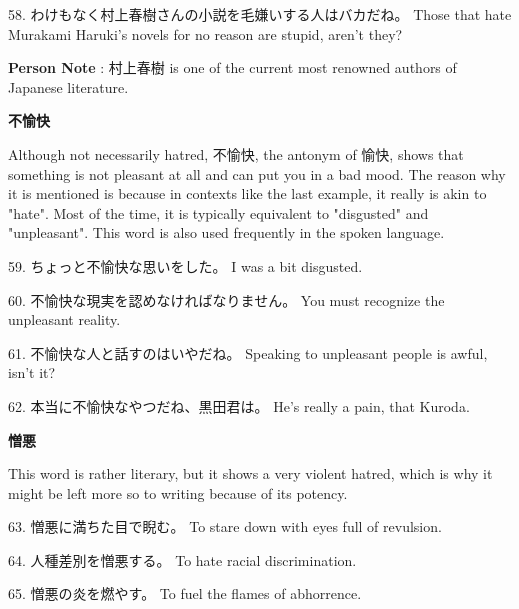 \par{58. わけもなく村上春樹さんの小説を毛嫌いする人はバカだね。 \hfill\break
Those that hate Murakami Haruki's novels for no reason are stupid, aren't they? }
 
\par{\textbf{Person Note }: 村上春樹 is one of the current most renowned authors of Japanese literature. }
 
\begin{center}
\textbf{不愉快 }
\end{center}
 
\par{ Although not necessarily hatred, 不愉快, the antonym of 愉快, shows that something is not pleasant at all and can put you in a bad mood. The reason why it is mentioned is because in contexts like the last example, it really is akin to "hate". Most of the time, it is typically equivalent to "disgusted" and "unpleasant". This word is also used frequently in the spoken language. }
 
\par{59. ちょっと不愉快な思いをした。 \hfill\break
I was a bit disgusted. }
 
\par{60. 不愉快な現実を認めなければなりません。 \hfill\break
You must recognize the unpleasant reality. }
 
\par{61. 不愉快な人と話すのはいやだね。 \hfill\break
Speaking to unpleasant people is awful, isn't it? }
 
\par{62. 本当に不愉快なやつだね、黒田君は。 \hfill\break
He's really a pain, that Kuroda. }
 
\begin{center}
\textbf{憎悪 } 
\end{center}
 
\par{ This word is rather literary, but it shows a very violent hatred, which is why it might be left more so to writing because of its potency. }
 
\par{63. 憎悪に満ちた目で睨む。 \hfill\break
To stare down with eyes full of revulsion. }
 
\par{64. 人種差別を憎悪する。 \hfill\break
To hate racial discrimination. }
 
\par{65. 憎悪の炎を燃やす。 \hfill\break
To fuel the flames of abhorrence. }
 
